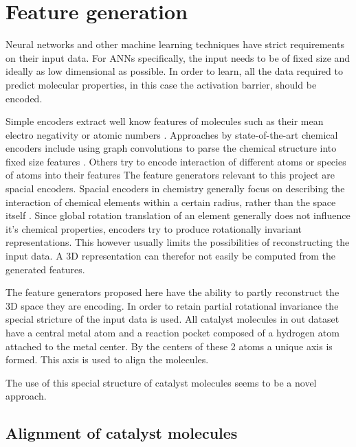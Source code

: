 
\chapter{Feature generation}
\label{ch:features}
Neural networks and other machine learning techniques have strict requirements on their input data.
For ANNs specifically, the input needs to be of fixed size and ideally as low dimensional as possible.
In order to learn, all the data required to predict molecular properties, in this case the activation barrier, should be encoded.

Simple encoders extract well know features of molecules such as their mean electro negativity or atomic numbers \cite{LO20181538}.
Approaches by state-of-the-art chemical encoders include using graph convolutions to parse the chemical structure into fixed size features \cite{GNN_ENCODER}.
Others try to encode interaction of different atoms or species of atoms into their features \cite{PhysRevLett.108.058301}
The feature generators relevant to this project are spacial encoders.
Spacial encoders in chemistry generally focus on describing the interaction of chemical elements within a certain radius, rather 
than the space itself \cite{Bart_k_2013}.
Since global rotation translation of an element generally does not influence it's chemical properties, 
encoders try to produce rotationally invariant representations.
This however usually limits the possibilities of reconstructing the input data.
A 3D representation can therefor not easily be computed from the generated features.

The feature generators proposed here have the ability to partly reconstruct the 3D space they are encoding.
In order to retain partial rotational invariance the special stricture of the input data is used.
All catalyst molecules in out dataset have a central metal atom and a reaction pocket composed of a hydrogen atom attached to the metal center.
By the centers of these 2 atoms a unique axis is formed.
This axis is used to align the molecules.

The use of this special structure of catalyst molecules seems to be a novel approach.

\section{Alignment of catalyst molecules}

